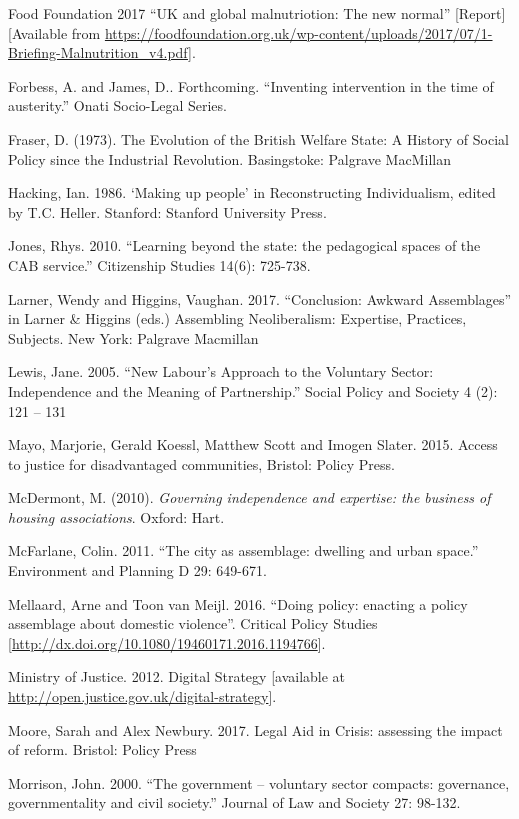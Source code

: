 \begin{thebibliography}{99}
\item Food Foundation 2017 “UK and global malnutriotion: The new normal” [Report] [Available from \url{https://foodfoundation.org.uk/wp-content/uploads/2017/07/1-Briefing-Malnutrition\_v4.pdf}].
\item Forbess, A. and James, D.. Forthcoming. “Inventing intervention in the time of austerity.” Onati Socio-Legal Series.
\item Fraser, D. (1973). The Evolution of the British Welfare State: A History of Social Policy since the Industrial Revolution. Basingstoke: Palgrave MacMillan
\item Hacking, Ian. 1986. ‘Making up people’ in Reconstructing Individualism, edited by T.C. Heller. Stanford: Stanford University Press.
\item Jones, Rhys. 2010. “Learning beyond the state: the pedagogical spaces of the CAB service.” Citizenship Studies 14(6): 725-738.
\item Larner, Wendy and Higgins, Vaughan. 2017. “Conclusion: Awkward Assemblages” in Larner \& Higgins (eds.) Assembling Neoliberalism: Expertise, Practices, Subjects. New York: Palgrave Macmillan
\item Lewis, Jane. 2005. “New Labour's Approach to the Voluntary Sector: Independence and the Meaning of Partnership.” Social Policy and Society  4 (2): 121 – 131
\item Mayo, Marjorie, Gerald Koessl, Matthew Scott and Imogen Slater. 2015. Access to justice for disadvantaged communities, Bristol: Policy Press.
\item McDermont, M. (2010). \textit{Governing independence and expertise: the business of housing associations}. Oxford: Hart.
\item McFarlane, Colin. 2011. “The city as assemblage: dwelling and urban space.” Environment and Planning D 29: 649-671.
\item Mellaard, Arne and Toon van Meijl. 2016. “Doing policy: enacting a policy assemblage about domestic violence”. Critical Policy Studies [\url{http://dx.doi.org/10.1080/19460171.2016.1194766}].
\item Ministry of Justice. 2012. Digital Strategy [available at \url{http://open.justice.gov.uk/digital-strategy}].
\item Moore, Sarah and Alex Newbury. 2017. Legal Aid in Crisis: assessing the impact of reform. Bristol: Policy Press
\item Morrison, John. 2000. “The government – voluntary sector compacts: governance, governmentality and civil society.” Journal of Law and Society 27: 98-132.

\end{thebibliography}

